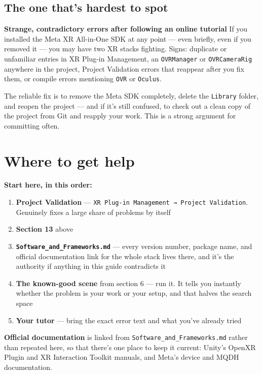\documentclass[11pt,a4paper]{article}
\providecommand{\tightlist}{\setlength{\itemsep}{2pt}\setlength{\parskip}{0pt}}
\begin{document}
\subsection{The one that's hardest to spot}\label{the-one-thats-hardest-to-spot}

\textbf{Strange, contradictory errors after following an online tutorial}
If you installed the Meta XR All-in-One SDK at any point --- even briefly, even if you
removed it --- you may have two XR stacks fighting. Signs: duplicate or unfamiliar entries
in XR Plug-in Management, an \texttt{OVRManager} or \texttt{OVRCameraRig} anywhere in the project,
Project Validation errors that reappear after you fix them, or compile errors mentioning
\texttt{OVR} or \texttt{Oculus}.

The reliable fix is to remove the Meta SDK completely, delete the \texttt{Library} folder, and
reopen the project --- and if it's still confused, to check out a clean copy of the project
from Git and reapply your work. This is a strong argument for committing often.


\section{Where to get help}\label{where-to-get-help}

\textbf{Start here, in this order:}

\begin{enumerate}
\def\labelenumi{\arabic{enumi}.}
\tightlist
\item
  \textbf{Project Validation} --- \texttt{XR\ Plug-in\ Management\ →\ Project\ Validation}. Genuinely fixes
  a large share of problems by itself
\item
  \textbf{Section 13} above
\item
  \textbf{\texttt{Software\_and\_Frameworks.md}} --- every version number, package name, and official
  documentation link for the whole stack lives there, and it's the authority if anything
  in this guide contradicts it
\item
  \textbf{The known-good scene} from section 6 --- run it. It tells you instantly whether the
  problem is your work or your setup, and that halves the search space
\item
  \textbf{Your tutor} --- bring the exact error text and what you've already tried
\end{enumerate}

\textbf{Official documentation} is linked from \texttt{Software\_and\_Frameworks.md} rather than
repeated here, so that there's one place to keep it current: Unity's OpenXR Plugin and XR
Interaction Toolkit manuals, and Meta's device and MQDH documentation.
\end{document}
